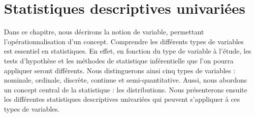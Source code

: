\documentclass[
  11pt,
  french,
]{book}
\begin{document}
\hypertarget{chap02}{%
\chapter{Statistiques descriptives univariées}\label{chap02}}

Dans ce chapitre, nous décrirons la notion de variable, permettant l'opérationnalisation d'un concept. Comprendre les différents types de variables est essentiel en statistiques. En effet, en fonction du type de variable à l'étude, les tests d'hypothèse et les méthodes de statistique inférentielle que l'on pourra appliquer seront différents. Nous distinguerons ainsi cinq types de variables : nominale, ordinale, discrète, continue et semi-quantitative. Aussi, nous abordons un concept central de la statistique : les distributions. Nous présenterons ensuite les différentes statistiques descriptives univariées qui peuvent s'appliquer à ces types de variables.
\end{document}
